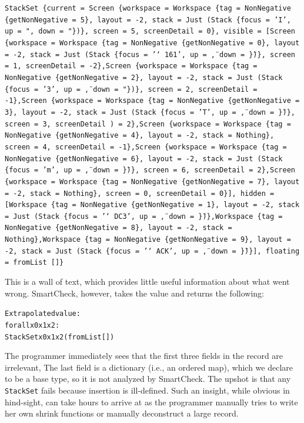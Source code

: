 \documentclass{sigplanconf}
\newenvironment{code}{\begin{alltt}}{\end{alltt}}
\newcommand{\ttp}[1]{\texttt{#1}}
\begin{document}
\medskip%
\begin{sloppypar}
\footnotesize
\noindent%
\ttp{StackSet \{current = Screen \{workspace = Workspace \{tag = NonNegative
  \{getNonNegative = 5\}, layout = -2, stack = Just (Stack \{focus = 'I', up =
  ", down = "\})\}, screen = 5, screenDetail = 0\}, visible = [Screen
    \{workspace = Workspace \{tag = NonNegative \{getNonNegative = 0\}, layout =
    -2, stack = Just (Stack \{focus = '\char`\\161', up = \", down =
    \"\})\}, screen = 1, screenDetail = -2\},Screen \{workspace = Workspace
    \{tag = NonNegative \{getNonNegative = 2\}, layout = -2, stack = Just (Stack
    \{focus = '3', up = \", down = "\})\}, screen = 2, screenDetail =
    -1\},Screen \{workspace = Workspace \{tag = NonNegative \{getNonNegative =
    3\}, layout = -2, stack = Just (Stack \{focus = 'T', up = \", down =
    \"\})\}, screen = 3, screenDetail ) = 2\},Screen \{workspace = Workspace
    \{tag = NonNegative \{getNonNegative = 4\}, layout = -2, stack = Nothing\},
    screen = 4, screenDetail = -1\},Screen \{workspace = Workspace \{tag =
    NonNegative \{getNonNegative = 6\}, layout = -2, stack = Just (Stack \{focus
    = 'm', up = \", down = \"\})\}, screen = 6, screenDetail = 2\},Screen
    \{workspace = Workspace \{tag = NonNegative \{getNonNegative = 7\}, layout =
    -2, stack = Nothing\}, screen = 0, screenDetail = 0\}], hidden = [Workspace
    \{tag = NonNegative \{getNonNegative = 1\}, layout = -2, stack = Just (Stack
    \{focus = '\char`\\DC3', up = \", down = \"\})\},Workspace \{tag = NonNegative \{getNonNegative = 8\}, layout = -2, stack = Nothing\},Workspace \{tag = NonNegative \{getNonNegative = 9\}, layout = -2, stack = Just (Stack \{focus = '\char`\\ACK', up = \", down = \"\})\}], floating = fromList []\} }
\end{sloppypar}
\medskip%
\noindent
This is a wall of text, which provides little useful information about what went
wrong.  SmartCheck, however, takes the value and returns the following:
%
\begin{code}
Extrapolated value:
forall x0 x1 x2:
  StackSet x0 x1 x2 (fromList [])
\end{code}
%
\noindent
The programmer immediately sees that the first three fields in the record are
irrelevant,  The last field is a dictionary (i.e., an ordered map), which we
declare to be a base type, so it is not analyzed by SmartCheck.  The upshot is
that any \ttp{StackSet} fails because insertion is ill-defined.  Such an
insight, while obvious in hind-sight, can take hours to arrive at as the
programmer manually tries to write her own shrink functions or manually
deconstruct a large record.
\end{document}
